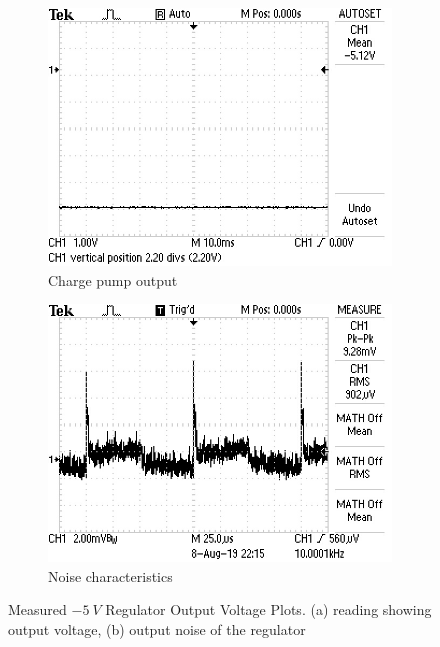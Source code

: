 \begin{figure}
 \centering
     \begin{subfigure}[]{0.45\textwidth}
        \centering
         \includegraphics[width=1\linewidth]{./Figures/min_5V_output_voltage.JPG}
		    \caption{Charge pump output} \label{subfig:charge_pump_min_5V}
     \end{subfigure}
      \begin{subfigure}[]{0.45\textwidth}
              \centering
\includegraphics[width=1\linewidth]{./Figures/min_5V_output_noise.JPG}%
		    \caption{Noise characteristics}  \label{subfig:charge_pump_noise}
     \end{subfigure}
   \caption[Measured $\SI{-5}{V}$ Regulator Output Voltage Plots]{Measured $\SI{-5}{V}$ Regulator Output Voltage Plots. (a) reading showing output voltage, (b) output noise of the regulator}
    \label{fig:charge_pump_simulation_results_box}
 \end{figure}







